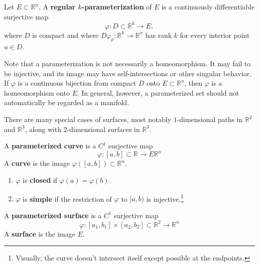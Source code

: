 	\begin{definition}
		Let $E \subset \mathbb{R}^n$. A \textbf{regular $k$-parameterization} of $E$ is a continuously differentiable surjective map
		\begin{equation}
			\varphi : D \subset \mathbb{R}^k \longrightarrow E,
		\end{equation}
		where $D$ is compact and where $D\varphi_p : \mathbb{R}^k \to \mathbb{R}^n$ has rank $k$ for every interior point $u \in D$.
	\end{definition}
			
	Note that a parameterization is not necessarily a homeomorphism. It may fail to be injective, and its image may have self-intersections or other singular behavior. If $\varphi$ is a continuous bijection from compact $D$ onto $E \subset \mathbb{R}^n$, then $\varphi$ is a homeomorphism onto $E$. In general, however, a parameterized set should not automatically be regarded as a manifold.
			
	There are many special cases of surfaces, most notably $1$-dimensional paths in $\mathbb{R}^2$ and $\mathbb{R}^3$, along with $2$-dimensional surfaces in $\mathbb{R}^3$. 
			
	\begin{definition}[Curve]
	  A \textbf{parameterized curve} is a $C^1$ surjective map 
		\begin{equation}
			\varphi: [a, b] \subset \mathbb{R} \to E \mathbb{R}^n
		\end{equation} 
		A \textbf{curve} is the image $\varphi([a, b]) \subset \mathbb{R}^n$. 
			
		\begin{enumerate}
			\item $\varphi$ is \textbf{closed} if $\varphi(a) = \varphi(b)$. 
			\item $\varphi$ is \textbf{simple} if the restriction of $\varphi$ to $[a, b)$ is injective.\footnote{Visually, the curve doesn't intersect itself except possible at the endpoints.}
		\end{enumerate}
	\end{definition}
			
	\begin{definition}[Surface]
	  A \textbf{parameterized surface} is a $C^1$ surjective map 
		\begin{equation}
			\varphi: [a_1, b_1] \times [a_2, b_2] \subset \mathbb{R}^2 \to \mathbb{R}^n
		\end{equation}
		A \textbf{surface} is the image $E$. 
	\end{definition}
		
